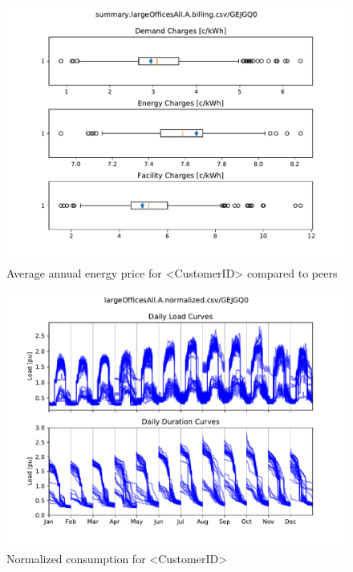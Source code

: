 \documentclass[11pt]{article}
\begin{document}
\begin{figure}[!h]
\centering
\includegraphics[width=\columnwidth, page=1, trim=0in 2.1in 0in 2.1in, clip]{visuals/largeOfficesAll.A.whiskercharts.pdf}
\caption{Average annual energy price for <CustomerID> compared to peers}
\label{fig:PeerCompEn}
\end{figure}

\clearpage

\pagestyle{demand}
\lipsum[1][1-7]

\begin{figure}[!h]
\centering
\includegraphics[width=\columnwidth, page=1, trim=0in 0.45in 0in 0.45in, clip]{visuals/largeOfficesAll.A.duration.monthly.test.pdf}
\caption{Normalized consumption for <CustomerID>}
\label{fig:duration}
\end{figure}
\end{document}
